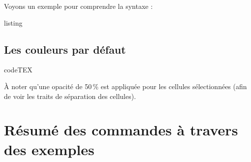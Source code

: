 \documentclass[a4paper,french]{article}
\begin{document}
Voyons un exemple pour comprendre la syntaxe :

\medskip

\begin{tcblisting}{listing}
\end{tcblisting}

\newpage

\subsection{Les couleurs par d\'efaut}

\begin{tcblisting}{codeTEX}

\end{tcblisting}

\medskip

\`A noter qu'une opacit\'e de 50\,\% est appliqu\'ee pour les cellules s\'electionn\'ees (afin de voir les traits de s\'eparation des cellules).

\section{R\'esum\'e des commandes \`a travers des exemples}
\end{document}
